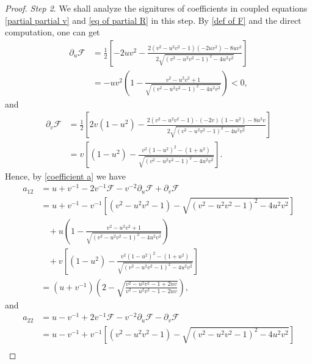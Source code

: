 \documentclass[10pt,a4paper]{amsart}
\begin{document}
\begin{proof}
	{\textit{Step 2}}. We shall analyze the signitures of coefficients in coupled equations \eqref{partial partial v} and \eqref{eq of partial R} in this step. By \eqref{def of F} and the direct computation, one can get
	\begin{equation} \label{partial u F}
		\begin{aligned}
			\partial_{u}\mathcal{F} & =  \frac{1}{2}\left[ -2uv^2 - \frac{2(v^2-u^{2}v^2-1) ( -2uv^2 ) - 8 uv^2 }{2\sqrt{(v^2-u^{2}v^2-1)^2 -4u^{2}v^{2} }} \right] \\
			& =  -uv^{2} \left(  1- \frac{v^2-u^{2}v^2+1 }{\sqrt{(v^2-u^{2}v^2-1)^2 -4u^{2}v^{2} }} \right) <0 ,
		\end{aligned}
	\end{equation}
	and
	\begin{equation}
		\begin{aligned}
			\partial_{v}\mathcal{F}& =  \frac{1}{2}\left[ 2v(1-u^2) - \frac{2(v^2-u^{2}v^2-1) \cdot(-2v)(1-u^2)  - 8 u^2 v }{2\sqrt{(v^2-u^{2}v^2-1)^2 -4u^{2}v^{2} }} \right]  \\
			& = v \left[ (1-u^2) - \frac{v^2(1-u^{2})^{2} - (1+u^2) }{\sqrt{(v^2-u^{2}v^2-1)^2 -4u^{2}v^{2} }} \right].
		\end{aligned}
	\end{equation}
	Hence, by \eqref{coefficient a} we have
	\begin{equation*} 
		\begin{aligned}
			a_{12} & =u+v^{-1}-2v^{-1}\mathcal{F}- v^{-2} \partial_{u}\mathcal{F} + \partial_{v}\mathcal{F} \\
			& =u+v^{-1}- v^{-1} \left[ (v^2-u^{2}v^2-1)-\sqrt{(v^2-u^{2}v^2-1)^2 -4u^{2}v^{2} }\right]  \\
			& \ \ \ \ + u \left(   1- \frac{v^2-u^{2}v^2+1 }{\sqrt{(v^2-u^{2}v^2-1)^2 -4u^{2}v^{2} }}  \right)\\
			& \ \ \ \   + v \left[ (1-u^2) - \frac{v^2(1-u^{2})^{2} - (1+u^2) }{\sqrt{(v^2-u^{2}v^2-1)^2 -4u^{2}v^{2} }} \right]   \\
			& = (u+v^{-1}) \left( 2- \sqrt{\frac{v^2-u^{2}v^2-1+2uv}{v^2-u^{2}v^2-1-2uv}} \right) ,
		\end{aligned}
	\end{equation*}	
	and
	\begin{equation*} 
		\begin{aligned}
			a_{22} & =u-v^{-1}+2v^{-1}\mathcal{F}- v^{-2} \partial_{u}\mathcal{F} - \partial_{v}\mathcal{F} \\
			& =u-v^{-1}+ v^{-1} \left[ (v^2-u^{2}v^2-1)-\sqrt{(v^2-u^{2}v^2-1)^2 -4u^{2}v^{2} }\right]  \\

\end{aligned}
\end{equation*}
\end{proof}
\end{document}
